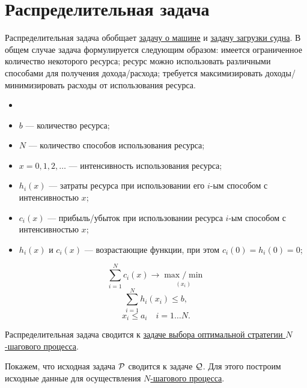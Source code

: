 \section{Распределительная задача}

\label{pr:distribution}

Распределительная задача обобщает \hyperref[pr:car_on_island]{задачу о машине} и \hyperref[pr:loading_vessel]{задачу загрузки судна}. В общем случае задача формулируется следующим образом: имеется ограниченное количество некоторого ресурса; ресурс можно использовать различными способами для получения дохода/расхода; требуется максимизировать доходы/минимизировать расходы от использования ресурса.

\mathmodel

\begin{itemize}[nosep]
	\item[]

	\item $b$ --- количество ресурса;
	
	\item $N$ --- количество способов использования ресурса;
	
	\item $x = 0, 1, 2, \dots$ --- интенсивность использования ресурса;
	
	\item $h_i(x)$ --- затраты ресурса при использовании его $i$-ым способом с интенсивностью $x$;
	
	\item $c_i(x)$ --- прибыль/убыток при использовании ресурса $i$-ым способом с интенсивностью $x$;
	
	\item $h_i(x)$ и $c_i(x)$ --- возрастающие функции, при этом $c_i(0) = h_i(0) = 0$;
\end{itemize}

\[
\sum_{i=1}^{N}c_i(x) \to \underset{(x_i)}{\max / \min}
\]
\[
\sum_{i=1}^{N} h_i(x_i) \le b,
\]
\[
x_i \le a_i \quad i = 1 \dots N.
\]

\fact

Распределительная задача сводится к \hyperref[def:opt_strategy]{задаче выбора оптимальной стратегии $N$-шагового процесса}.

\prooof

Покажем, что исходная задача $\P$ сводится к задаче $\Q$. Для этого построим исходные данные для осуществления \hyperref[def:n_step_process]{$N$-шагового процесса}.

